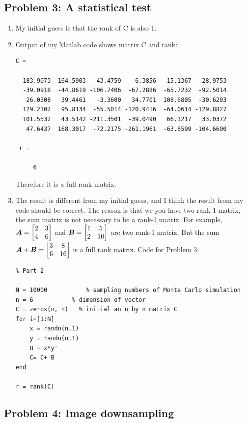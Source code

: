 \documentclass{article}
\begin{document}
\hypertarget{problem_3_a_statistical_test_5}{}\subsection*{{Problem 3: A statistical test}}\label{problem_3_a_statistical_test_5}

\begin{enumerate}
\item My initial guess is that the rank of C is also 1. 
\item Output of my Matlab code shows matrix C and rank: 
\begin{verbatim}
C =

  183.9073 -164.5903   43.4759   -6.3856  -15.1367   28.9753
  -39.0918  -44.8619 -106.7406  -67.2886  -65.7232  -92.5014
   26.0308   39.4461   -3.3600   34.7701  108.6805  -30.6203
  129.2102   95.8134  -55.5014 -120.9416  -64.0614 -129.8827
  101.5532   43.5142 -211.3501  -39.0490   66.1217   33.0372
   47.6437  168.3017  -72.2175 -261.1961  -63.8599 -104.6600
  
 r =

     6
\end{verbatim} 
Therefore it is a full rank matrix. 

\item The result is different from my initial guess, and I think the result from my code should be correct. The reason is that we you have two rank-1 matrix, the sum matrix is not necessary to be a rank-1 matrix. For example, \newline 
$ \boldsymbol{A} = \begin{bmatrix} 2& 3\\ 4 &6 \end{bmatrix} $ 
and $ \boldsymbol{B} = \begin{bmatrix} 1 & 5 \\ 2 & 10 \end{bmatrix} $ are two rank-1 matrix.  \newline 
But the sum $\boldsymbol{A}+\boldsymbol{B} = \begin{bmatrix} 3 & 8\\ 6 & 16 \end{bmatrix}$  is a full rank matrix. 
Code for Problem 3: 
\begin{lstlisting}
% Part 2 

N = 10000			% sampling numbers of Monte Carlo simulation
n = 6 			% dimension of vector 
C = zeros(n, n)   % initial an n by n matrix C 
for i=[1:N] 
    x = randn(n,1)
    y = randn(n,1)
    B = x*y'
    C= C+ B
end 

r = rank(C)
\end{lstlisting} 

\end{enumerate} 


\hypertarget{problem_4_image_downsampling_6}{}\subsection*{{Problem 4: Image downsampling}}\label{problem_4_image_downsampling_6}
\end{document}
